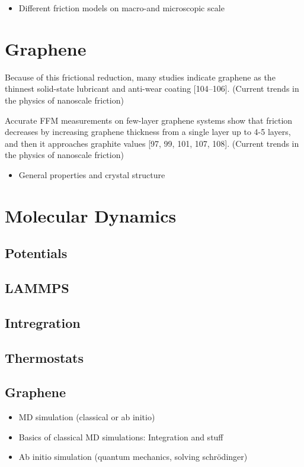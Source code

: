 \begin{itemize}
  \item Different friction models on macro-and microscopic scale
\end{itemize}
\section{Graphene}
Because of this frictional reduction, many studies indicate graphene as the thinnest solid-state lubricant and anti-wear coating [104–106]. (Current trends in the physics of nanoscale friction)


Accurate FFM measurements on few-layer graphene systems show that friction decreases by increasing graphene thickness from a single layer up to 4-5 layers, and then it approaches graphite values [97, 99, 101, 107, 108]. (Current trends in the physics of nanoscale friction)



\begin{itemize}
  \item General properties and crystal structure
\end{itemize}
\section{Molecular Dynamics}
\subsection{Potentials}
\subsection{LAMMPS}
\subsection{Intregration}
\subsection{Thermostats}
\subsection{Graphene}



\begin{itemize}
  \item MD simulation (classical or ab initio)
  \item Basics of classical MD simulations: Integration and stuff
  \item Ab initio simulation (quantum mechanics, solving schrödinger)
\end{itemize}
